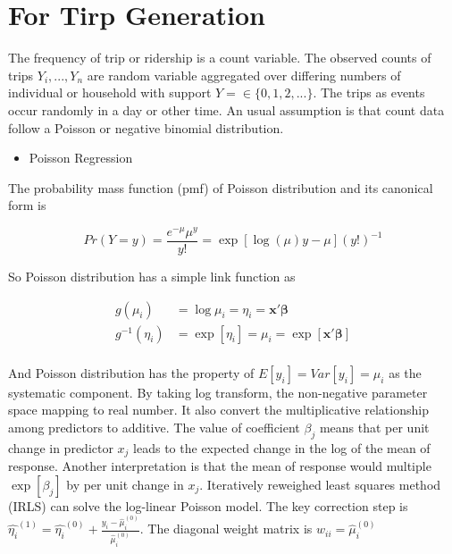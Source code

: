 \documentclass[
  11pt,
  openany]{memoir}
\providecommand{\tightlist}{%
  \setlength{\itemsep}{0pt}\setlength{\parskip}{0pt}}
\begin{document}
\hypertarget{for-tirp-generation}{%
\section{For Tirp Generation}\label{for-tirp-generation}}

The frequency of trip or ridership is a count variable. The observed counts of trips \(Y_i,...,Y_n\) are random variable aggregated over differing numbers of individual or household with support \(Y=\in\{0,1,2,...\}\).
The trips as events occur randomly in a day or other time.
An usual assumption is that count data follow a Poisson or negative binomial distribution.

\begin{itemize}
\tightlist
\item
  Poisson Regression
\end{itemize}

The probability mass function (pmf) of Poisson distribution and its canonical form is

\begin{equation}
Pr(Y=y) = \frac{e^{-\mu}\mu^y}{y!}=\exp[\log(\mu) y-\mu](y!)^{-1}
\end{equation}

So Poisson distribution has a simple link function as

\begin{equation}
\begin{split}
g(\mu_i)&=\log\mu_i=\eta_i=\mathbf{x}'\boldsymbol{\beta}\\
g^{-1}(\eta_i)&=\exp[\eta_i]=\mu_i=\exp[\mathbf{x}'\boldsymbol{\beta}]\\
\end{split}
\label{eq:pois-link}
\end{equation}

And Poisson distribution has the property of \(E[y_i]=Var[y_i]=\mu_i\) as the systematic component.
By taking log transform, the non-negative parameter space mapping to real number.
It also convert the multiplicative relationship among predictors to additive.
The value of coefficient \(\beta_j\) means that per unit change in predictor \(x_j\) leads to the expected change in the log of the mean of response.
Another interpretation is that the mean of response would multiple \(\exp[\beta_j]\) by per unit change in \(x_j\).
Iteratively reweighed least squares method (IRLS) can solve the log-linear Poisson model.
The key correction step is \(\hat{\eta_i}^{(1)}=\hat{\eta_i}^{(0)} + \frac{y_i-\hat\mu_i^{(0)}}{\hat\mu_i^{(0)}}\).
The diagonal weight matrix is \(w_{ii}=\hat\mu_i^{(0)}\)
\end{document}

